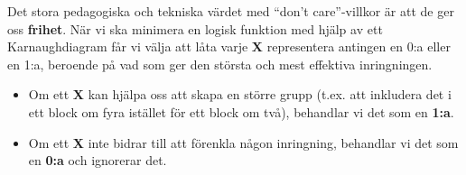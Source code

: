 \documentclass[
  swedish,
  letterpaper,
  oneside,
  openany]{book}
\providecommand{\tightlist}{%
  \setlength{\itemsep}{0pt}\setlength{\parskip}{0pt}}
\begin{document}
Det stora pedagogiska och tekniska värdet med ``don't care''-villkor är
att de ger oss \textbf{frihet}. När vi ska minimera en logisk funktion
med hjälp av ett Karnaughdiagram får vi välja att låta varje \textbf{X}
representera antingen en 0:a eller en 1:a, beroende på vad som ger den
största och mest effektiva inringningen.

\begin{itemize}
\tightlist
\item
  Om ett \textbf{X} kan hjälpa oss att skapa en större grupp (t.ex. att
  inkludera det i ett block om fyra istället för ett block om två),
  behandlar vi det som en \textbf{1:a}.
\item
  Om ett \textbf{X} inte bidrar till att förenkla någon inringning,
  behandlar vi det som en \textbf{0:a} och ignorerar det.
\end{itemize}
\end{document}

